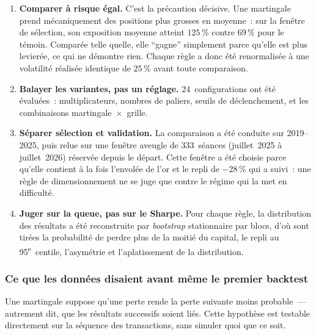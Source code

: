 \begin{enumerate}
\item \textbf{Comparer à risque égal.} C'est la précaution décisive. Une martingale prend mécaniquement des positions plus grosses en moyenne~: sur la fenêtre de sélection, son exposition moyenne atteint $125\,\%$ contre $69\,\%$ pour le témoin. Comparée telle quelle, elle \enquote{gagne} simplement parce qu'elle est plus levierée, ce qui ne démontre rien. Chaque règle a donc été renormalisée à une volatilité réalisée identique de $25\,\%$ avant toute comparaison.

\item \textbf{Balayer les variantes, pas un réglage.} $24$~configurations ont été évaluées~: multiplicateurs, nombres de paliers, seuils de déclenchement, et les combinaisons martingale~$\times$~grille.

\item \textbf{Séparer sélection et validation.} La comparaison a été conduite sur 2019--2025, puis relue sur une fenêtre aveugle de $333$~séances (juillet~2025 à juillet~2026) réservée depuis le départ. Cette fenêtre a été choisie parce qu'elle contient à la fois l'envolée de l'or et le repli de $-28\,\%$ qui a suivi~: une règle de dimensionnement ne se juge que contre le régime qui la met en difficulté.

\item \textbf{Juger sur la queue, pas sur le Sharpe.} Pour chaque règle, la distribution des résultats a été reconstruite par \emph{bootstrap} stationnaire par blocs, d'où sont tirées la probabilité de perdre plus de la moitié du capital, le repli au 95\textsuperscript{e}~centile, l'asymétrie et l'aplatissement de la distribution.
\end{enumerate}

\subsubsection*{Ce que les données disaient avant même le premier backtest}

Une martingale suppose qu'une perte rende la perte suivante moins probable~--- autrement dit, que les résultats successifs soient liés. Cette hypothèse est testable directement sur la séquence des transactions, sans simuler quoi que ce soit.

